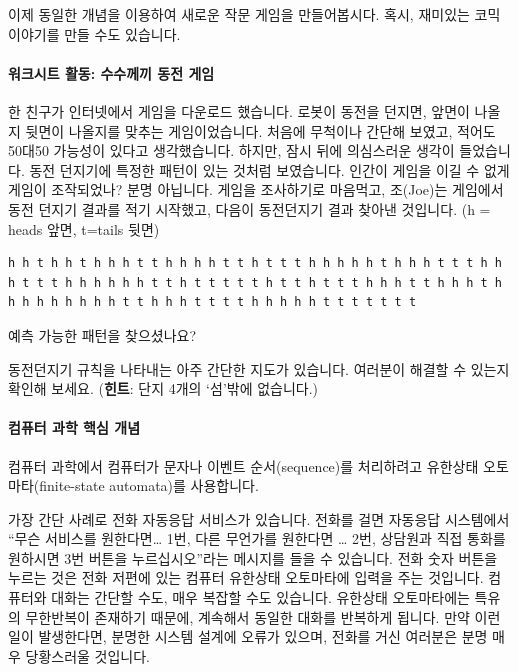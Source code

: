 \documentclass[]{article}
\begin{document}
이제 동일한 개념을 이용하여 새로운 작문 게임을 만들어봅시다. 혹시,
재미있는 코믹 이야기를 만들 수도 있습니다.

\mbox{}\paragraph{워크시트 활동: 수수께끼 동전 게임}\label{section-168}

한 친구가 인터넷에서 게임을 다운로드 했습니다. 로봇이 동전을 던지면,
앞면이 나올지 뒷면이 나올지를 맞추는 게임이었습니다. 처음에 무척이나
간단해 보였고, 적어도 50대50 가능성이 있다고 생각했습니다. 하지만, 잠시
뒤에 의심스러운 생각이 들었습니다. 동전 던지기에 특정한 패턴이 있는
것처럼 보였습니다. 인간이 게임을 이길 수 없게 게임이 조작되었나? 분명
아닙니다. 게임을 조사하기로 마음먹고, 조(Joe)는 게임에서 동전 던지기
결과를 적기 시작했고, 다음이 동전던지기 결과 찾아낸 것입니다. (h = heads
앞면, t=tails 뒷면)

\begin{verbatim}
h h t h h t h h h t t h h h h t t h t t t h h h h h t h h h t t t h h h t t t h h h h h h t t h t t t t t h t t h t t t h h h t t h h h t h h h h h h h h h t t h h h t t t t h h h h h t t t t t t t
\end{verbatim}

예측 가능한 패턴을 찾으셨나요?

동전던지기 규칙을 나타내는 아주 간단한 지도가 있습니다. 여러분이 해결할
수 있는지 확인해 보세요. (\textbf{힌트}: 단지 4개의 `섬'밖에 없습니다.)

\mbox{}\paragraph{컴퓨터 과학 핵심 개념}\label{section-169}

컴퓨터 과학에서 컴퓨터가 문자나 이벤트 순서(sequence)를 처리하려고
유한상태 오토마타(finite-state automata)를 사용합니다.

가장 간단 사례로 전화 자동응답 서비스가 있습니다. 전화를 걸면 자동응답
시스템에서 ``무슨 서비스를 원한다면\ldots{} 1번, 다른 무언가를 원한다면
\ldots{} 2번, 상담원과 직접 통화를 원하시면 3번 버튼을 누르십시오''라는
메시지를 들을 수 있습니다. 전화 숫자 버튼을 누르는 것은 전화 저편에 있는
컴퓨터 유한상태 오토마타에 입력을 주는 것입니다. 컴퓨터와 대화는 간단할
수도, 매우 복잡할 수도 있습니다. 유한상태 오토마타에는 특유의 무한반복이
존재하기 때문에, 계속해서 동일한 대화를 반복하게 됩니다. 만약 이런 일이
발생한다면, 분명한 시스템 설계에 오류가 있으며, 전화를 거신 여러분은
분명 매우 당황스러울 것입니다.
\end{document}
